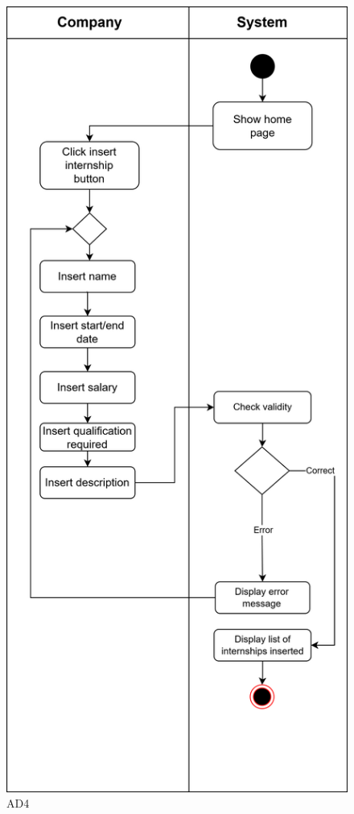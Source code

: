 \begin{figure}[H]
    \centering
    \includegraphics[width=0.65\linewidth]{Images/insert_internship.png}
    \caption{AD4}
    \label{AD4}
\end{figure}

